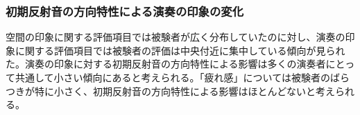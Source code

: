 \documentclass[11pt,a4j]{jreport}
\begin{document}

\newpage
\subsubsection*{初期反射音の方向特性による演奏の印象の変化}
空間の印象に関する評価項目では被験者が広く分布していたのに対し、演奏の印象に関する評価項目では被験者の評価は中央付近に集中している傾向が見られた。演奏の印象に対する初期反射音の方向特性による影響は多くの演奏者にとって共通して小さい傾向にあると考えられる。「疲れ感」については被験者のばらつきが特に小さく、初期反射音の方向特性による影響はほとんどないと考えられる。

\end{document}
